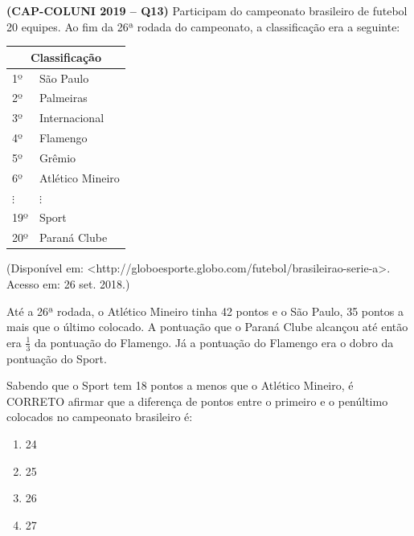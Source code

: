 \textbf{(CAP-COLUNI 2019 -- Q13)} Participam do campeonato brasileiro de futebol 20 equipes. Ao fim da 26ª rodada do campeonato, a classificação era a seguinte:
\begin{center}
\begin{tabular}{ll}
\multicolumn{2}{c}{Classificação}\\\hline
1º & São Paulo\\
2º & Palmeiras\\
3º & Internacional\\
4º & Flamengo\\
5º & Grêmio\\
6º & Atlético Mineiro\\
$\vdots$ & $\vdots$\\
19º & Sport\\
20º & Paraná Clube
\end{tabular}
\end{center}
\begin{center}(Disponível em: <http://globoesporte.globo.com/futebol/brasileirao-serie-a>. Acesso em: 26 set. 2018.)\end{center}

Até a 26ª rodada, o Atlético Mineiro tinha 42 pontos e o São Paulo, 35 pontos a mais que o último colocado. A pontuação que o Paraná Clube alcançou até então era $\frac{1}{3}$ da pontuação do Flamengo. Já a pontuação do Flamengo era o dobro da pontuação do Sport.

Sabendo que o Sport tem 18 pontos a menos que o Atlético Mineiro, é CORRETO afirmar que a diferença de pontos entre o primeiro e o penúltimo colocados no campeonato brasileiro é:

\begin{enumerate}
	\item 24
	\item 25
	\item 26
	\item 27
\end{enumerate}
